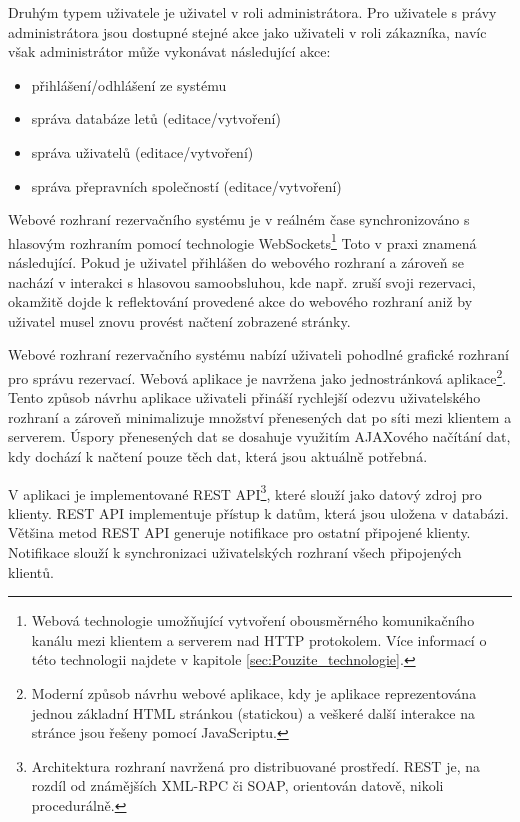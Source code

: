 \documentclass[ing,male,java,dept460]{diploma}						%
\begin{document}
Druhým typem uživatele je uživatel v roli administrátora. Pro uživatele s právy administrátora jsou dostupné stejné akce jako uživateli v roli zákazníka, navíc však administrátor může vykonávat následující akce:

\begin{itemize}
\item přihlášení/odhlášení ze systému
\item správa databáze letů (editace/vytvoření)
\item správa uživatelů (editace/vytvoření)
\item správa přepravních společností (editace/vytvoření)
\end{itemize}

Webové rozhraní rezervačního systému je v reálném čase synchronizováno s hlasovým rozhraním pomocí technologie WebSockets\footnote{Webová technologie umožňující vytvoření obousměrného komunikačního kanálu mezi klientem a serverem nad HTTP protokolem. Více informací o této technologii najdete v kapitole \ref{sec:Pouzite_technologie}.} Toto v praxi znamená následující. Pokud je uživatel přihlášen do webového rozhraní a zároveň se nachází v interakci s hlasovou samoobsluhou, kde např. zruší svoji rezervaci, okamžitě dojde k reflektování provedené akce do webového rozhraní aniž by uživatel musel znovu provést načtení zobrazené stránky.

Webové rozhraní rezervačního systému nabízí uživateli pohodlné grafické rozhraní pro správu rezervací. Webová aplikace je navržena jako jednostránková aplikace\footnote{Moderní způsob návrhu webové aplikace, kdy je aplikace reprezentována jednou základní HTML stránkou (statickou) a veškeré další interakce na stránce jsou řešeny pomocí JavaScriptu.}. Tento způsob návrhu aplikace uživateli přináší rychlejší odezvu uživatelského rozhraní a zároveň minimalizuje množství přenesených dat po síti mezi klientem a serverem. Úspory přenesených dat se dosahuje využitím AJAXového načítání dat, kdy dochází k načtení pouze těch dat, která jsou aktuálně potřebná.

V aplikaci je implementované REST API\footnote{Architektura rozhraní navržená pro distribuované prostředí. REST je, na rozdíl od známějších XML-RPC či SOAP, orientován datově, nikoli procedurálně.}, které slouží jako datový zdroj pro klienty. REST API implementuje přístup k datům, která jsou uložena v databázi. Většina metod REST API generuje notifikace pro ostatní připojené klienty. Notifikace slouží k synchronizaci uživatelských rozhraní všech připojených klientů.
\end{document}
